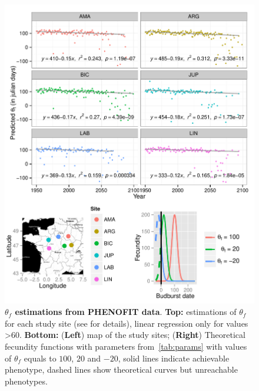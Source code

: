 \documentclass[a4paper, 12pt]{article}
\begin{document}
\begin{figure}[ht!]
	\centering
	\includegraphics[scale=1]{Figures/optsmaps.pdf}
	\caption{\textbf{$\theta_{f}$ estimations from PHENOFIT data}. \textbf{Top:} estimations of $\theta_f$ for each study site (see  for details), linear regression only for values >60. \textbf{Bottom:} (\textbf{Left}) map of the study sites; (\textbf{Right}) Theoretical fecundity functions with parameters from~\autoref{tab:params} with values of $\theta_f$ equals to $100$, $20$ and $-20$, solid lines indicate achievable phenotype, dashed lines show theoretical curves but unreachable phenotypes.}
	\label{fig:thetaf}
\end{figure}
\end{document}
